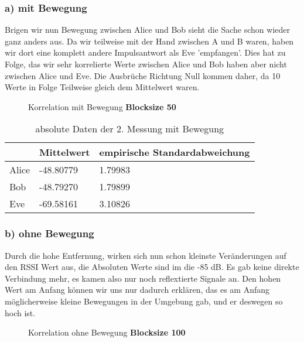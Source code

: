 \documentclass[12pt,a4paper]{article}
\begin{document}
\subsubsection*{a) mit Bewegung}
Brigen wir nun Bewegung zwischen Alice und Bob sieht die Sache schon wieder ganz anders aus. Da wir teilweise mit der Hand zwischen A und B waren, haben wir dort eine komplett andere Impulsantwort als Eve 'empfangen'. Dies hat zu Folge, das wir sehr korrelierte Werte zwischen Alice und Bob haben aber nicht zwischen Alice und Eve. Die Ausbrüche Richtung Null kommen daher, da 10 Werte in Folge Teilweise gleich dem Mittelwert waren. 
\begin{figure}[H]
\centering
{} \qquad
{}
\caption{Korrelation mit Bewegung \textbf{Blocksize 50}}
\label{fig:3_a_m}
\end{figure}

\begin{table}[H]
\centering
\begin{tabular}{l|l|l}
& Mittelwert & empirische Standardabweichung \\
\hline
Alice & -48.80779 & 1.79983 \\
\hline
Bob & -48.79270 & 1.79899 \\
\hline
Eve & -69.58161 & 3.10826 \\
\end{tabular}
\caption{absolute Daten der 2. Messung mit Bewegung}
\end{table}

\subsubsection*{b) ohne Bewegung}
Durch die hohe Entfernung, wirken sich nun schon kleinste Veränderungen auf den RSSI Wert aus, die Absoluten Werte sind im die -85 dB. Es gab keine direkte Verbindung mehr, es kamen also nur noch reflextierte Signale an. Den hohen Wert am Anfang können wir uns nur dadurch erklären, das es am Anfang möglicherweise kleine Bewegungen in der Umgebung gab, und er deswegen so hoch ist.
\begin{figure}[H]
\centering
{} \qquad
{}
\caption{Korrelation ohne Bewegung \textbf{Blocksize 100}}
\label{fig:3_b_o}
\end{figure}
\end{document}
